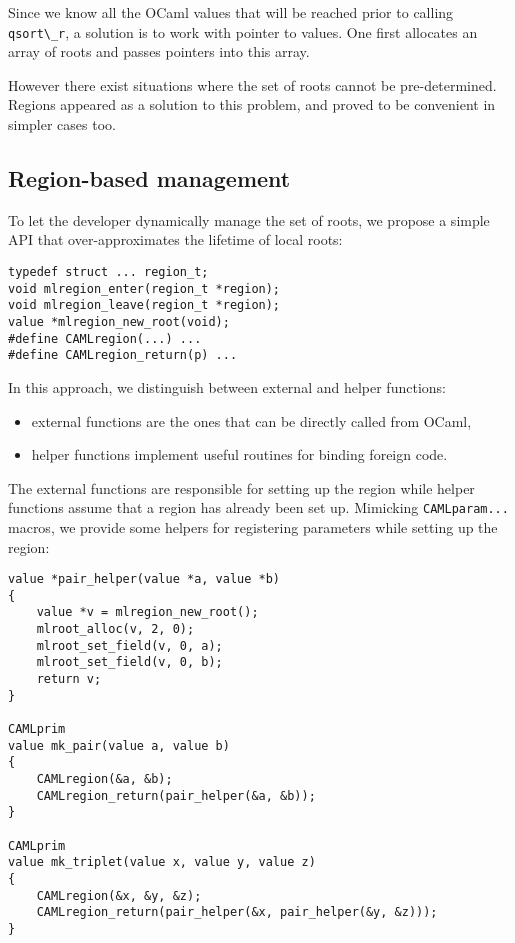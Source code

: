 \documentclass[a4paper]{easychair}
\newcommand{\cpp}[1]{\lstinline[style=C++]{#1}}
\begin{document}
Since we know all the OCaml values that will be reached prior to calling
\cpp{qsort\_r}, a solution is to work with pointer to values. One
first allocates an array of roots and passes pointers into this array.

However there exist situations where the set of roots cannot be pre-determined.
Regions appeared as a solution to this problem, and proved to be convenient in
simpler cases too.

\subsection{Region-based management}

To let the developer dynamically manage the set of roots, we propose a
simple API that over-approximates the lifetime of local roots:
%
\begin{lstlisting}[style=C++]
typedef struct ... region_t;
void mlregion_enter(region_t *region);
void mlregion_leave(region_t *region);
value *mlregion_new_root(void);
#define CAMLregion(...) ...
#define CAMLregion_return(p) ...
\end{lstlisting}

In this approach, we distinguish between external and helper functions:
%
\begin{itemize}
\item external functions are the ones that can be directly called from OCaml,
\item helper functions implement useful routines for binding foreign code.
\end{itemize}

The external functions are responsible for setting up the region while
helper functions assume that a region has already been set up. Mimicking
\cpp{CAMLparam...} macros, we provide some helpers for registering
parameters while setting up the region:
%
\begin{lstlisting}[style=C++]
value *pair_helper(value *a, value *b)
{
    value *v = mlregion_new_root();
    mlroot_alloc(v, 2, 0);
    mlroot_set_field(v, 0, a);
    mlroot_set_field(v, 0, b);
    return v;
}

CAMLprim
value mk_pair(value a, value b)
{
    CAMLregion(&a, &b);
    CAMLregion_return(pair_helper(&a, &b));
}

CAMLprim
value mk_triplet(value x, value y, value z)
{
    CAMLregion(&x, &y, &z);
    CAMLregion_return(pair_helper(&x, pair_helper(&y, &z)));
}
\end{lstlisting}
\end{document}
